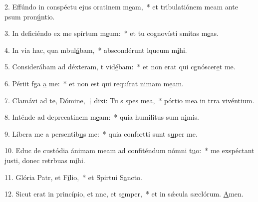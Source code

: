 2. Effúndo in conspéctu ejus oratinem m\uline{e}am,~* et tribulatiónem meam ante psum pron\uline{ú}ntio.\par 
3. In deficiéndo ex me spírtum m\uline{e}um:~* et tu cognovísti smitas m\uline{e}as.\par 
4. In via hac, qua mbul\uline{á}bam,~* abscondérunt lqueum m\uline{i}hi.\par 
5. Considerábam ad déxteram, t vid\uline{é}bam:~* et non erat qui cgnóscer\uline{e}t me.\par 
6. Périit fga \uline{a} me:~* et non est qui requírat nimam m\uline{e}am.\par 
7. Clamávi ad te, \uline{Dó}mine,~† dixi: Tu s spes m\uline{e}a,~* pórtio mea in trra viv\uline{é}ntium.\par 
8. Inténde ad deprecatinem m\uline{e}am:~* quia humilitus sum n\uline{i}mis.\par 
9. Líbera me a persentib\uline{u}s me:~* quia confortti sunt s\uline{u}per me.\par 
10. Educ de custódia ánimam meam ad confiténdum nómni t\uline{u}o:~* me exspéctant justi, donec retrbuas m\uline{i}hi.\par 
11. Glória Patr, et F\uline{í}lio,~* et Spirtui S\uline{a}ncto.\par 
12. Sicut erat in princípio, et nnc, et s\uline{e}mper,~* et in sǽcula sæclórum. \uline{A}men.\par 
